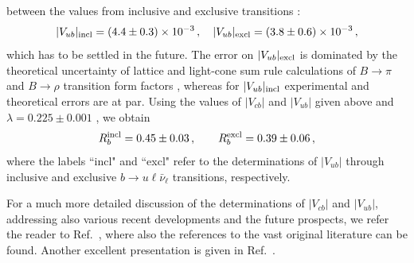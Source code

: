 \documentclass[12pt]{article}
\begin{document}
between the values from inclusive and exclusive transitions \cite{HFAG}:
\begin{equation}
|V_{ub}|_{\rm incl} = (4.4\pm 0.3)\times 10^{-3}\,,\quad 
|V_{ub}|_{\rm excl} = (3.8\pm 0.6)\times 10^{-3}\,,
\end{equation}
which has to be settled in the future. 
The error on $|V_{ub}|_{\rm excl}$ is dominated by the theoretical
uncertainty of lattice and light-cone sum rule calculations of $B\to\pi$ and
$B\to\rho$ transition form factors \cite{Vublatt,LCSR}, whereas for
$|V_{ub}|_{\rm incl}$ experimental and theoretical errors are at par.
Using the values of $|V_{cb}|$ and $|V_{ub}|$ given above
and $\lambda =0.225\pm0.001$ \cite{blucher}, we obtain
\begin{equation}\label{Rb}
R_b^{\rm incl} = 0.45\pm 0.03\,,\qquad R_b^{\rm excl} = 0.39\pm
0.06\,,
\end{equation}
where the labels ``incl" and ``excl" refer to the determinations of $|V_{ub}|$
through inclusive and exclusive $b\to u\ell\bar \nu_\ell$ transitions, 
respectively. 


For a much more detailed discussion of the determinations of $|V_{cb}|$ 
and $|V_{ub}|$, addressing also various recent developments 
and the future prospects, we refer the reader to Ref.~\cite{CKM-book}, where 
also the references to the vast original literature can be found. Another 
excellent presentation is given in Ref.~\cite{BaBar-book}.
\end{document}
